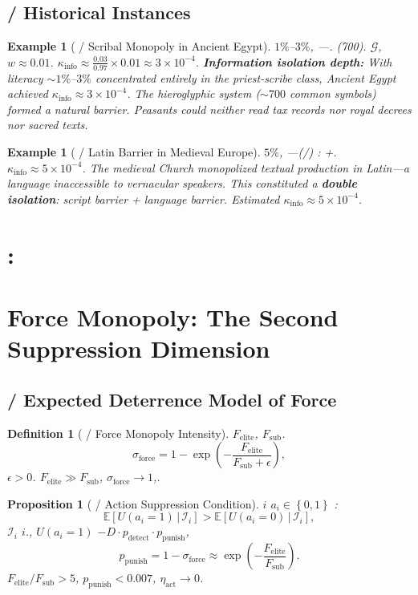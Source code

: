 \documentclass[11pt,a4paper]{article}
\newtheorem{proposition}[theorem]{Proposition}
\newtheorem{definition}[theorem]{Definition}
\newtheorem{example}[theorem]{Example}
\theoremstyle{definition}
\newcommand{\coupling}{\kappa}
\newcommand{\suppress}{\sigma}
\newcommand{\given}{\,|\,}
\newcommand{\paren}[1]{\left(#1\right)}
\newcommand{\bracket}[1]{\left[#1\right]}
\newcommand{\set}[1]{\left\{#1\right\}}
\begin{document}
\subsection{ / Historical Instances}
\begin{example}[ / Scribal Monopoly in Ancient Egypt]
\label{ex:egypt}
 $1\%$--$3\%$, ---.
(700).
 $\mathcal{G}$, $w \approx 0.01$.
 $\coupling_{\text{info}} \approx \frac{0.03}{0.97} \times 0.01 \approx 3 \times 10^{-4}$.
\textbf{Information isolation depth:} With literacy $\sim 1\%$--$3\%$
concentrated entirely in the priest-scribe class, Ancient Egypt achieved
$\coupling_{\text{info}} \approx 3 \times 10^{-4}$.
The hieroglyphic system ($\sim 700$ common symbols) formed a natural barrier.
Peasants could neither read tax records nor royal decrees nor sacred texts.
\end{example}
\begin{example}[ / Latin Barrier in Medieval Europe]
\label{ex:latin}
 $5\%$, ---(/)
: +.
 $\coupling_{\text{info}} \approx 5 \times 10^{-4}$.
The medieval Church monopolized textual production in Latin---a language
inaccessible to vernacular speakers. This constituted a \textbf{double isolation}:
script barrier + language barrier. Estimated $\coupling_{\text{info}} \approx 5 \times 10^{-4}$.
\end{example}
\section{:}
\section{Force Monopoly: The Second Suppression Dimension}
\subsection{ / Expected Deterrence Model of Force}
\begin{definition}[ / Force Monopoly Intensity]
\label{def:force}
 $F_{\text{elite}}$, $F_{\text{sub}}$.
\[
\suppress_{\text{force}} = 1 - \exp\paren{-\frac{F_{\text{elite}}}{F_{\text{sub}} + \epsilon}},
\]
 $\epsilon > 0$. $F_{\text{elite}} \gg F_{\text{sub}}$, 
$\suppress_{\text{force}} \to 1$,.
\end{definition}
\begin{proposition}[ / Action Suppression Condition]
\label{prop:action}
 $i$ $a_i \in \set{0,1}$ : 
\[
\mathbb{E}\bracket{U(a_i=1) \given \mathcal{I}_i} > \mathbb{E}\bracket{U(a_i=0) \given \mathcal{I}_i},
\]
 $\mathcal{I}_i$ $i$., $U(a_i=1)$ 
$-D \cdot p_{\text{detect}} \cdot p_{\text{punish}}$, 
\[
p_{\text{punish}} = 1 - \suppress_{\text{force}} \approx \exp\paren{-\frac{F_{\text{elite}}}{F_{\text{sub}}}}.
\]
 $F_{\text{elite}}/F_{\text{sub}} > 5$, $p_{\text{punish}} < 0.007$, 
 $\eta_{\text{act}} \to 0$.
\end{proposition}
\end{document}
